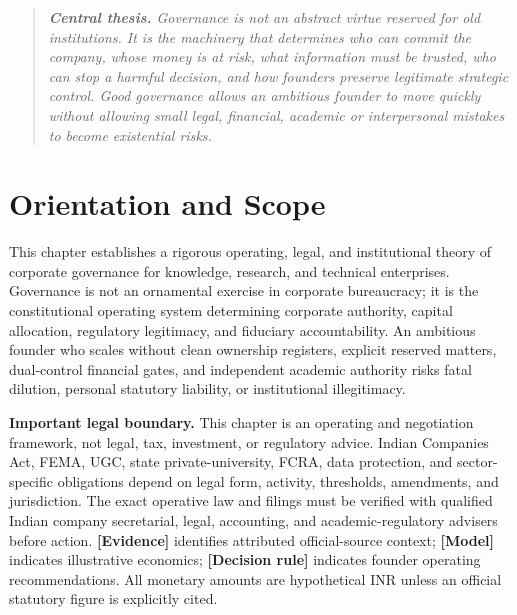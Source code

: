 
\begin{quote}
\itshape
\textbf{Central thesis.} Governance is not an abstract virtue reserved for old institutions. It is the machinery that determines who can commit the company, whose money is at risk, what information must be trusted, who can stop a harmful decision, and how founders preserve legitimate strategic control. Good governance allows an ambitious founder to move quickly without allowing small legal, financial, academic or interpersonal mistakes to become existential risks.
\end{quote}

\section*{Orientation and Scope}

This chapter establishes a rigorous operating, legal, and institutional theory of corporate governance for knowledge, research, and technical enterprises. Governance is not an ornamental exercise in corporate bureaucracy; it is the constitutional operating system determining corporate authority, capital allocation, regulatory legitimacy, and fiduciary accountability. An ambitious founder who scales without clean ownership registers, explicit reserved matters, dual-control financial gates, and independent academic authority risks fatal dilution, personal statutory liability, or institutional illegitimacy.

\textbf{Important legal boundary.} This chapter is an operating and negotiation framework, not legal, tax, investment, or regulatory advice. Indian Companies Act, FEMA, UGC, state private-university, FCRA, data protection, and sector-specific obligations depend on legal form, activity, thresholds, amendments, and jurisdiction. The exact operative law and filings must be verified with qualified Indian company secretarial, legal, accounting, and academic-regulatory advisers before action. \textbf{[Evidence]} identifies attributed official-source context; \textbf{[Model]} indicates illustrative economics; \textbf{[Decision rule]} indicates founder operating recommendations. All monetary amounts are hypothetical INR unless an official statutory figure is explicitly cited.

